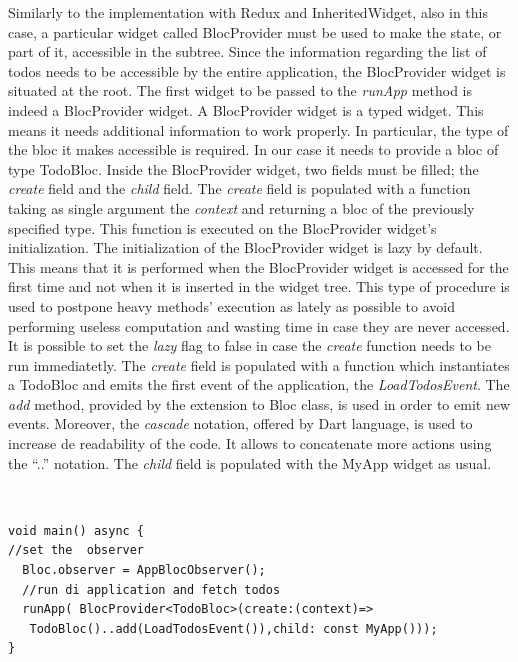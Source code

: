 Similarly to the implementation with Redux and InheritedWidget,  also in this case, a particular widget called BlocProvider must be used to make the state,  or part of it, accessible in the subtree. Since the information regarding the list of todos needs to be accessible by the entire application, the BlocProvider widget is situated at the root. The first widget to be passed to the \textit{runApp} method is indeed a BlocProvider widget. A BlocProvider widget is a typed widget. This means it needs additional information to work properly. In particular, the type of the bloc it makes accessible is required. In our case it needs to provide a bloc of type TodoBloc. Inside the BlocProvider widget,  two fields must  be filled; the \textit{create} field and the \textit{child} field. The \textit{create} field is populated with a function taking as single argument the \textit{context} and returning a bloc of the previously specified type. This function is executed on the BlocProvider widget's initialization. The initialization of the BlocProvider widget is lazy by default. This means that it is performed when the BlocProvider widget is accessed for the first time and not when it is inserted in the widget tree. This type of procedure is used to postpone heavy methods' execution as lately as possible to avoid performing useless computation and wasting time in case they are never accessed. It is possible to set the \textit{lazy} flag to false in case the \textit{create} function needs to be run immediatetly. The \textit{create} field is populated with a function which instantiates a TodoBloc and emits the first event of the application, the \textit{LoadTodosEvent}. The \textit{add} method,  provided by the extension to Bloc class, is used in order to emit new events. Moreover,  the \textit{cascade} notation, offered by Dart language,  is used to increase de readability of the code. It allows to concatenate more actions using the  “..” notation.
The \textit{child} field is populated with the MyApp widget as usual.
\begin{code}
\mbox{}\\
 \mbox{}
\label{code:2.14}
\begin{verbatim}
void main() async {
//set the  observer
  Bloc.observer = AppBlocObserver();
  //run di application and fetch todos
  runApp( BlocProvider<TodoBloc>(create:(context)=>
   TodoBloc()..add(LoadTodosEvent()),child: const MyApp()));
}
\end{verbatim}
\mbox{}
\end{code}

